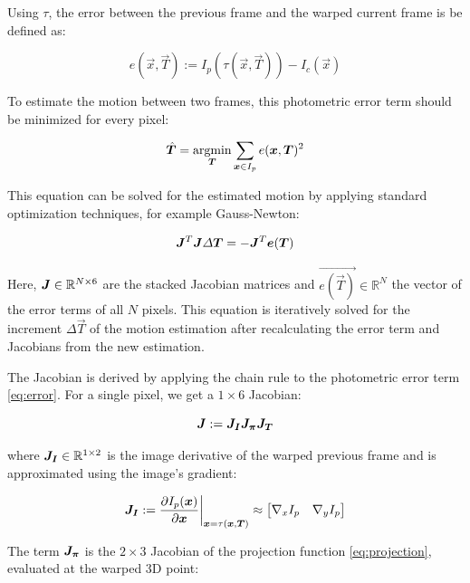 Using $\tau$, the error between the previous frame and the warped current frame is be defined as:

\begin{equation}
    \label{eq:error}
    e(\vec{x}, \vec{T}) := I_p(\tau(\vec{x}, \vec{T})) - I_c(\vec{x})
\end{equation}


To estimate the motion between two frames, this photometric error term should
be minimized for every pixel:

\begin{equation}
    \vec{\hat{T}} = \operatornamewithlimits{argmin}_{\vec{T}} \sum_{\vec{x} \in I_p} e(\vec{x}, \vec{T})^2
\end{equation}


This equation can be solved for the estimated motion by applying standard
optimization techniques, for example Gauss-Newton:

\begin{equation}
    \mat{J}^T \mat{J} \Delta \vec{T} = - \mat{J}^T \vec{e(\vec{T})}
\end{equation}

Here, $\mat{J} \in \mathbb{R}^{N \times 6}$ are the stacked Jacobian matrices
and $\vec{e(\vec{T})} \in \mathbb{R}^N$ the vector of the error terms of all
$N$ pixels.  This equation is iteratively solved for the increment $\Delta
\vec{T}$ of the motion estimation after recalculating the error term and
Jacobians from the new estimation.

The Jacobian is derived by applying the chain rule to the photometric error term \ref{eq:error}.
For a single pixel, we get a $1 \times 6$ Jacobian:

\begin{equation}
    \mat{J} := \mat{J_I} \mat{J_{\pi}} \mat{J_T}
\end{equation}

where $\mat{J_I} \in \mathbb{R}^{1 \times 2}$ is the image derivative of the warped previous frame and is
approximated using the image's gradient:

\begin{equation}
    \mat{J_I} := \frac{\partial I_p(\vec{x})} {\partial \vec{x}} \bigg|_{\vec{x} = \tau(\vec{x}, \vec{T})}
    \approx
    \begin{bmatrix}
        \nabla{}_x I_p & \nabla{}_y I_p
    \end{bmatrix}
\end{equation}

The term $\mat{J_{\pi}}$ is the $2 \times 3$ Jacobian of the projection
function \ref{eq:projection}, evaluated at the warped 3D point:

